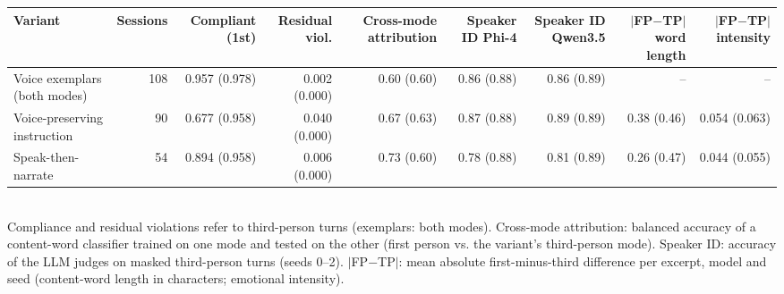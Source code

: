 \begin{tabular}{lrrrrrrrr}
\toprule
Variant & Sessions & Compliant (1st) & Residual viol. & Cross-mode attribution & Speaker ID Phi-4 & Speaker ID Qwen3.5 & $|$FP$-$TP$|$ word length & $|$FP$-$TP$|$ intensity \\
\midrule
Voice exemplars (both modes) & 108 & 0.957 (0.978) & 0.002 (0.000) & 0.60 (0.60) & 0.86 (0.88) & 0.86 (0.89) & -- & -- \\
Voice-preserving instruction & 90 & 0.677 (0.958) & 0.040 (0.000) & 0.67 (0.63) & 0.87 (0.88) & 0.89 (0.89) & 0.38 (0.46) & 0.054 (0.063) \\
Speak-then-narrate & 54 & 0.894 (0.958) & 0.006 (0.000) & 0.73 (0.60) & 0.78 (0.88) & 0.81 (0.89) & 0.26 (0.47) & 0.044 (0.055) \\
\bottomrule
\end{tabular}
\\[2pt]
{\footnotesize Compliance and residual violations refer to third-person turns (exemplars: both modes). Cross-mode attribution: balanced accuracy of a content-word classifier trained on one mode and tested on the other (first person vs. the variant's third-person mode). Speaker ID: accuracy of the LLM judges on masked third-person turns (seeds 0--2). $|$FP$-$TP$|$: mean absolute first-minus-third difference per excerpt, model and seed (content-word length in characters; emotional intensity).}
